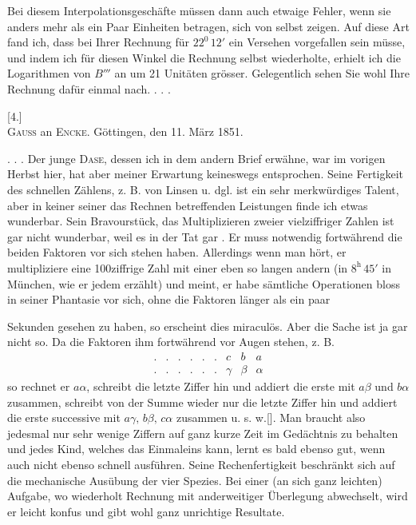Bei diesem Interpolationsgeschäfte müssen dann auch etwaige Fehler,
wenn sie anders mehr als ein Paar Einheiten betragen, sich von selbst zeigen.
Auf diese Art fand ich, dass bei Ihrer Rechnung für $22^0\,12'$ ein Versehen
vorgefallen sein müsse, und indem ich für diesen Winkel die Rechnung selbst
wiederholte, erhielt ich die Logarithmen von $B'''$ an um 21 Unitäten grösser.
Gelegentlich sehen Sie wohl Ihre Rechnung dafür einmal nach. . . .
\begin{center}[4.]\\[3pt]
\textsc{Gauss} an \textsc{Encke}. Göttingen, den 11. März 1851.\end{center}
\noindent\hspace*{\parindent}. . . Der junge \textsc{Dase}, dessen ich in dem andern Brief erwähne, war im
vorigen Herbst hier, hat aber meiner Erwartung keineswegs entsprochen. Seine
Fertigkeit des schnellen Zählens, z. B. von Linsen u. dgl. ist ein sehr merkwürdiges
Talent, aber in keiner seiner das Rechnen betreffenden Leistungen
finde ich etwas wunderbar. Sein Bravourstück, das Multiplizieren zweier vielziffriger
Zahlen  ist gar nicht wunderbar, weil es in der Tat gar
. Er muss notwendig fortwährend die beiden
Faktoren vor sich stehen haben. Allerdings wenn man hört, er multipliziere
eine 100ziffrige Zahl mit einer eben so langen andern  (in $8^{\mathrm h}\,45'$
in München, wie er jedem erzählt) und meint, er habe sämtliche Operationen
bloss in seiner Phantasie vor sich, ohne die Faktoren länger als ein paar
\par{}
\clearpage{}
\setcounter{footnote}{0}
\noindent Sekunden gesehen zu haben, so erscheint dies miraculös. Aber die Sache ist
ja gar nicht so. Da die Faktoren ihm fortwährend vor Augen stehen, z. B.
\[
\begin{array}{ccccccccc}
. & . & . & . & . & . & c & b & a\\
. & . & . & . & . & . & \gamma & \beta & \alpha
\end{array}
\]
\noindent so rechnet er $a\alpha$, schreibt die letzte Ziffer hin und addiert die erste mit $a\beta$
und $b\alpha$ zusammen, schreibt von der Summe wieder nur die letzte Ziffer hin
und addiert die erste successive mit $a\gamma,\,b\beta,\,c\alpha$ zusammen u. s. w.\begingroup[\footnotemark]\renewcommand{\thefootnote}{[\arabic{footnote})}\footnotetext{Man erkennt hier, dass \textsc{Gauss} auch die sogenannte symmetrische Multiplikation bekannt und
geläufig war. Den \textls[120]{praktischen} Wert dieses Verfahrens scheint er nicht hoch eingeschätzt zu haben.]}\endgroup. Man
braucht also jedesmal nur sehr wenige Ziffern auf ganz kurze Zeit im Gedächtnis
zu behalten und jedes Kind, welches das Einmaleins kann, lernt es
bald ebenso gut, wenn auch nicht ebenso schnell ausführen. Seine Rechenfertigkeit
beschränkt sich auf die mechanische Ausübung der vier Spezies. Bei
einer (an sich ganz leichten) Aufgabe, wo wiederholt Rechnung mit anderweitiger
Überlegung abwechselt, wird er leicht konfus und gibt wohl ganz
unrichtige Resultate.

